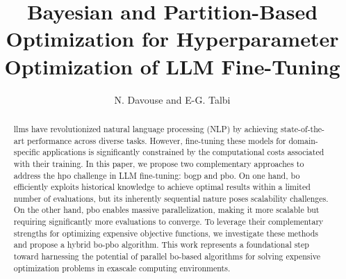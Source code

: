 \documentclass[runningheads]{ola}
\begin{document}
\pagestyle{headings}

\mainmatter

\title{Bayesian and Partition-Based Optimization for Hyperparameter Optimization of LLM Fine-Tuning}


\author{N. Davouse and E-G. Talbi}



\maketitle

\begin{abstract}
\acrfull{llm}s have revolutionized natural language processing (NLP) by achieving state-of-the-art performance across diverse tasks. However, fine-tuning these models for domain-specific applications is significantly constrained by the computational costs associated with their training. In this paper, we propose two complementary approaches to address the \acrfull{hpo} challenge in LLM fine-tuning: \acrfull{bogp} and \acrfull{pbo}. On one hand, \acrshort{bo} efficiently exploits historical knowledge to achieve optimal results within a limited number of evaluations, but its inherently sequential nature poses scalability challenges. On the other hand, \acrshort{pbo} enables massive parallelization, making it more scalable but requiring significantly more evaluations to converge. To leverage their complementary strengths for optimizing expensive objective functions, we investigate these methods and propose a hybrid \acrshort{bo}-\acrshort{pbo} algorithm. This work represents a foundational step toward harnessing the potential of parallel \acrlong{bo}-based algorithms for solving expensive optimization problems in exascale computing environments.
\end{abstract}






  









\end{document}
